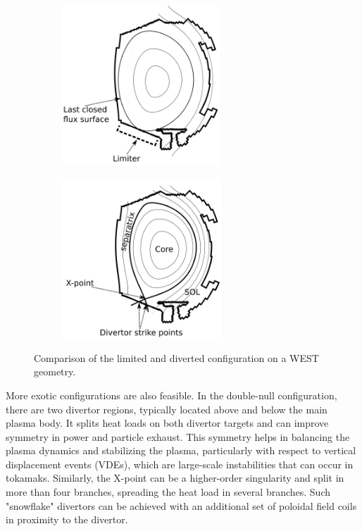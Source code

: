 \begin{figure}[H]
	\centering
	\begin{subfigure}[b]{0.45\textwidth}
		\centering
		\includegraphics[height=60mm]{schemes/WESTlimited.png}
		\label{fig:WEST_limited}
	\end{subfigure}
	\begin{subfigure}[b]{0.45\textwidth}
		\centering
		\includegraphics[height=60mm]{schemes/WESTdiverted.png}
		\label{fig:WEST_diverted}
	\end{subfigure}
	\caption{Comparison of the limited and diverted configuration on a WEST geometry. }
	\label{fig:1_limdivConfigs}
\end{figure}



More exotic configurations are also feasible. In the double-null configuration, there are two divertor regions, typically located above and below the main plasma body. It splits heat loads on both divertor targets and can improve symmetry in power and particle exhaust. This symmetry helps in balancing the plasma dynamics and stabilizing the plasma, particularly with respect to vertical displacement events (VDEs), which are large-scale instabilities that can occur in tokamaks. Similarly, the X-point can be a higher-order singularity and split in more than four branches, spreading the heat load in several branches\cite{ryutov2008magnetic}. Such "snowflake" divertors can be achieved with an additional set of poloidal field coils in proximity to the divertor.

